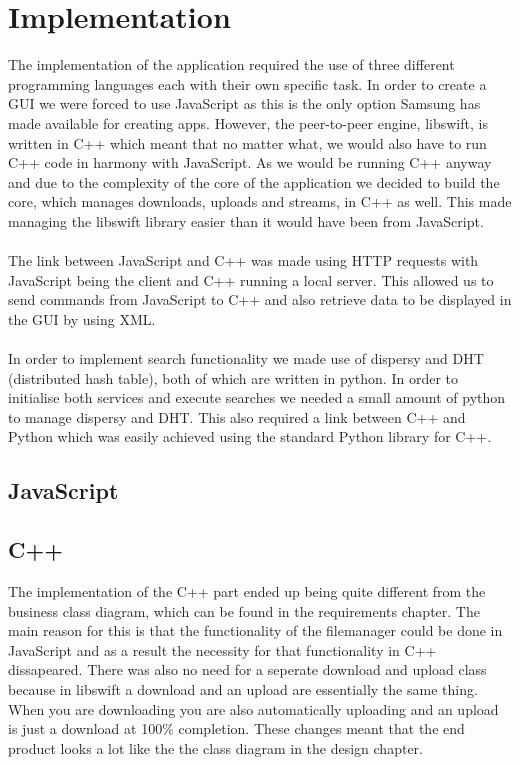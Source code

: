 \chapter{Implementation}

The implementation of the application required the use of three different programming languages each with their own specific task. In order to create a GUI we were forced to use JavaScript as this is the only option Samsung has made available for creating apps. However, the peer-to-peer engine, libswift, is written in C++ which meant that no matter what, we would also have to run C++ code in harmony with JavaScript. As we would be running C++ anyway and due to the complexity of the core of the application we decided to build the core, which manages downloads, uploads and streams, in C++ as well. This made managing the libswift library easier than it would have been from JavaScript.
\\\\
The link between JavaScript and C++ was made using HTTP requests with JavaScript being the client  and C++ running a local server. This allowed us to send commands from JavaScript to C++ and also retrieve data to be displayed in the GUI by using XML.
\\\\
In order to implement search functionality we made use of dispersy and DHT (distributed hash table), both of which are written in python. In order to initialise both services and execute searches we needed a small amount of python to manage dispersy and DHT. This also required a link between C++ and Python which was easily achieved using the standard Python library for C++.

\section{JavaScript}

\section{C++}

The implementation of the C++ part ended up being quite different from the business class diagram, which can be found in the requirements chapter. The main reason for this is that the functionality of the filemanager could be done in JavaScript and as a result the necessity for that functionality in C++ dissapeared. There was also no need for a seperate download and upload class because in libswift a download and an upload are essentially the same thing. When you are downloading you are also automatically uploading and an upload is just a download at 100\% completion. These changes meant that the end product looks a lot like the the class diagram in the design chapter.

